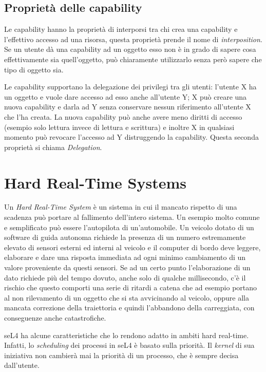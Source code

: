 \subsection{Proprietà delle capability}
Le capability hanno la proprietà di interporsi tra chi crea una capability e l'effettivo accesso ad una risorsa, questa proprietà prende il nome di \textit{interposition}. Se un utente dà una capability ad un oggetto esso non è in grado di sapere cosa effettivamente sia quell'oggetto, può chiaramente utilizzarlo senza però sapere che tipo di oggetto sia.

Le capability supportano la delegazione dei privilegi tra gli utenti: l'utente X ha un oggetto e vuole dare accesso ad esso anche all'utente Y; X può creare una nuova capability e darla ad Y senza conservare nessun riferimento all'utente X che l'ha creata. La nuova capability può anche avere meno diritti di accesso (esempio solo lettura invece di lettura e scrittura) e inoltre X in qualsiasi momento può revocare l'accesso ad Y distruggendo la capability. Questa seconda proprietà si chiama \textit{Delegation}.

\section{Hard Real-Time Systems}
Un \textit{Hard Real-Time System} è un sistema in cui il mancato rispetto di una scadenza può portare al fallimento dell'intero sistema. Un esempio molto comune e semplificato può essere l'autopilota di un'automobile. Un veicolo dotato di un software di guida autonoma richiede la presenza di un numero estremamente elevato di sensori esterni ed interni al veicolo e il computer di bordo deve leggere, elaborare e dare una risposta immediata ad ogni minimo cambiamento di un valore proveniente da questi sensori. Se ad un certo punto l'elaborazione di un dato richiede più del tempo dovuto, anche solo di qualche millisecondo, c'è il rischio che questo comporti una serie  di ritardi a catena che ad esempio portano al non rilevamento di un oggetto che si sta avvicinando al veicolo, oppure alla mancata correzione della traiettoria e quindi l'abbandono della carreggiata, con conseguenze anche catastrofiche.

seL4 ha alcune caratteristiche che lo rendono adatto in ambiti hard real-time. Infatti, lo \textit{scheduling} dei processi in seL4 è basato sulla priorità. Il \textit{kernel} di sua iniziativa non cambierà mai la priorità di un processo, che è sempre decisa dall'utente.


